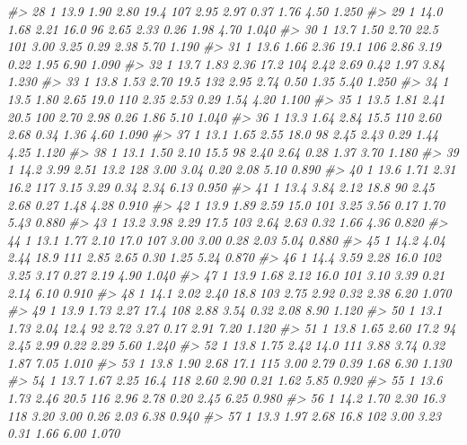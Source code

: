 \documentclass[]{book}
\newenvironment{Shaded}{\begin{snugshade}}{\end{snugshade}}
\newcommand{\CommentTok}[1]{\textcolor[rgb]{0.56,0.35,0.01}{\textit{#1}}}
\begin{document}
\begin{Shaded}
\begin{Highlighting}[]
\CommentTok{#> 28   1   13.9  1.90  2.80  19.4  107 2.95  2.97 0.37  1.76  4.50 1.250}
\CommentTok{#> 29   1   14.0  1.68  2.21  16.0   96 2.65  2.33 0.26  1.98  4.70 1.040}
\CommentTok{#> 30   1   13.7  1.50  2.70  22.5  101 3.00  3.25 0.29  2.38  5.70 1.190}
\CommentTok{#> 31   1   13.6  1.66  2.36  19.1  106 2.86  3.19 0.22  1.95  6.90 1.090}
\CommentTok{#> 32   1   13.7  1.83  2.36  17.2  104 2.42  2.69 0.42  1.97  3.84 1.230}
\CommentTok{#> 33   1   13.8  1.53  2.70  19.5  132 2.95  2.74 0.50  1.35  5.40 1.250}
\CommentTok{#> 34   1   13.5  1.80  2.65  19.0  110 2.35  2.53 0.29  1.54  4.20 1.100}
\CommentTok{#> 35   1   13.5  1.81  2.41  20.5  100 2.70  2.98 0.26  1.86  5.10 1.040}
\CommentTok{#> 36   1   13.3  1.64  2.84  15.5  110 2.60  2.68 0.34  1.36  4.60 1.090}
\CommentTok{#> 37   1   13.1  1.65  2.55  18.0   98 2.45  2.43 0.29  1.44  4.25 1.120}
\CommentTok{#> 38   1   13.1  1.50  2.10  15.5   98 2.40  2.64 0.28  1.37  3.70 1.180}
\CommentTok{#> 39   1   14.2  3.99  2.51  13.2  128 3.00  3.04 0.20  2.08  5.10 0.890}
\CommentTok{#> 40   1   13.6  1.71  2.31  16.2  117 3.15  3.29 0.34  2.34  6.13 0.950}
\CommentTok{#> 41   1   13.4  3.84  2.12  18.8   90 2.45  2.68 0.27  1.48  4.28 0.910}
\CommentTok{#> 42   1   13.9  1.89  2.59  15.0  101 3.25  3.56 0.17  1.70  5.43 0.880}
\CommentTok{#> 43   1   13.2  3.98  2.29  17.5  103 2.64  2.63 0.32  1.66  4.36 0.820}
\CommentTok{#> 44   1   13.1  1.77  2.10  17.0  107 3.00  3.00 0.28  2.03  5.04 0.880}
\CommentTok{#> 45   1   14.2  4.04  2.44  18.9  111 2.85  2.65 0.30  1.25  5.24 0.870}
\CommentTok{#> 46   1   14.4  3.59  2.28  16.0  102 3.25  3.17 0.27  2.19  4.90 1.040}
\CommentTok{#> 47   1   13.9  1.68  2.12  16.0  101 3.10  3.39 0.21  2.14  6.10 0.910}
\CommentTok{#> 48   1   14.1  2.02  2.40  18.8  103 2.75  2.92 0.32  2.38  6.20 1.070}
\CommentTok{#> 49   1   13.9  1.73  2.27  17.4  108 2.88  3.54 0.32  2.08  8.90 1.120}
\CommentTok{#> 50   1   13.1  1.73  2.04  12.4   92 2.72  3.27 0.17  2.91  7.20 1.120}
\CommentTok{#> 51   1   13.8  1.65  2.60  17.2   94 2.45  2.99 0.22  2.29  5.60 1.240}
\CommentTok{#> 52   1   13.8  1.75  2.42  14.0  111 3.88  3.74 0.32  1.87  7.05 1.010}
\CommentTok{#> 53   1   13.8  1.90  2.68  17.1  115 3.00  2.79 0.39  1.68  6.30 1.130}
\CommentTok{#> 54   1   13.7  1.67  2.25  16.4  118 2.60  2.90 0.21  1.62  5.85 0.920}
\CommentTok{#> 55   1   13.6  1.73  2.46  20.5  116 2.96  2.78 0.20  2.45  6.25 0.980}
\CommentTok{#> 56   1   14.2  1.70  2.30  16.3  118 3.20  3.00 0.26  2.03  6.38 0.940}
\CommentTok{#> 57   1   13.3  1.97  2.68  16.8  102 3.00  3.23 0.31  1.66  6.00 1.070}

\end{Highlighting}
\end{Shaded}
\end{document}
